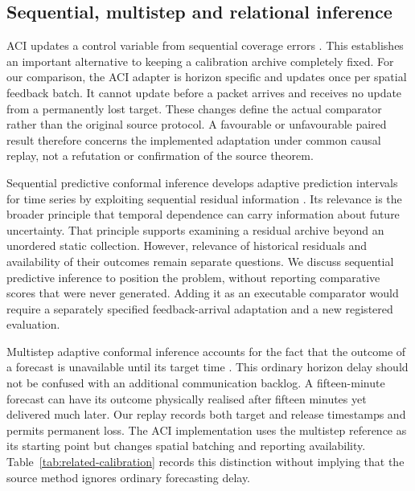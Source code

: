 \documentclass[pdflatex,sn-mathphys-num]{sn-jnl}
\begin{document}
\subsection{Sequential, multistep and relational inference}
ACI updates a control variable from sequential coverage errors \citep{gibbs2021}. This establishes an important alternative to keeping a calibration archive completely fixed. For our comparison, the ACI adapter is horizon specific and updates once per spatial feedback batch. It cannot update before a packet arrives and receives no update from a permanently lost target. These changes define the actual comparator rather than the original source protocol. A favourable or unfavourable paired result therefore concerns the implemented adaptation under common causal replay, not a refutation or confirmation of the source theorem.

Sequential predictive conformal inference develops adaptive prediction intervals for time series by exploiting sequential residual information \citep{xu2023}. Its relevance is the broader principle that temporal dependence can carry information about future uncertainty. That principle supports examining a residual archive beyond an unordered static collection. However, relevance of historical residuals and availability of their outcomes remain separate questions. We discuss sequential predictive inference to position the problem, without reporting comparative scores that were never generated. Adding it as an executable comparator would require a separately specified feedback-arrival adaptation and a new registered evaluation.

Multistep adaptive conformal inference accounts for the fact that the outcome of a forecast is unavailable until its target time \citep{hallberg2024}. This ordinary horizon delay should not be confused with an additional communication backlog. A fifteen-minute forecast can have its outcome physically realised after fifteen minutes yet delivered much later. Our replay records both target and release timestamps and permits permanent loss. The ACI implementation uses the multistep reference as its starting point but changes spatial batching and reporting availability. Table~\ref{tab:related-calibration} records this distinction without implying that the source method ignores ordinary forecasting delay.
\end{document}
